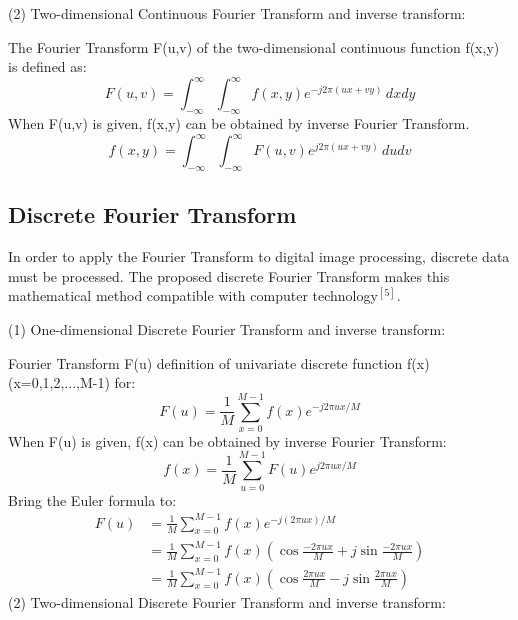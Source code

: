 (2) Two-dimensional Continuous Fourier Transform and inverse transform:

The Fourier Transform F(u,v) of the two-dimensional continuous function f(x,y) is defined as:
\begin{equation}
F(u,v) = \int_{-\infty}^{\infty} \int_{-\infty}^{\infty} f(x,y) e^{-j2\pi (ux + vy)} \, dxdy
\label{eq:2-3}
\end{equation}
When F(u,v) is given, f(x,y) can be obtained by inverse Fourier Transform.
\begin{equation}
f(x,y) = \int_{-\infty}^{\infty} \int_{-\infty}^{\infty} F(u,v) e^{j2\pi (ux + vy)} \, dudv
\label{eq:2-4}
\end{equation}
\subsection{Discrete Fourier Transform}

In order to apply the Fourier Transform to digital image processing, discrete data must be processed. The proposed discrete Fourier Transform makes this mathematical method compatible with computer technology$^{[5]}$.%

(1) One-dimensional Discrete Fourier Transform and inverse transform:

Fourier Transform F(u) definition of univariate discrete function f(x)(x=0,1,2,...,M-1) for:
\begin{equation}
F(u)=\frac{1}{M}\sum_{x=0}^{M-1}f(x)e^{-j2\pi ux/M}
\label{eq:2-5}
\end{equation}
When F(u) is given, f(x) can be obtained by inverse Fourier Transform:
\begin{equation}
f(x)=\frac{1}{M}\sum_{u=0}^{M-1}F(u)e^{j2\pi ux/M}
\label{eq:2-6}
\end{equation}
Bring the Euler formula to:
\begin{equation}
\begin{aligned}
F(u) &= \frac{1}{M} \sum_{x=0}^{M-1} f(x) e^{-j(2\pi u x)/M} \\
&= \frac{1}{M} \sum_{x=0}^{M-1} f(x) \left(\cos\frac{-2\pi u x}{M} + j \sin\frac{-2\pi u x}{M}\right) \\
&= \frac{1}{M} \sum_{x=0}^{M-1} f(x) \left(\cos \frac{2\pi u x}{M} - j \sin \frac{2\pi u x}{M}\right)
\end{aligned}
\label{eq:2-7}
\end{equation}
(2) Two-dimensional Discrete Fourier Transform and inverse transform:

